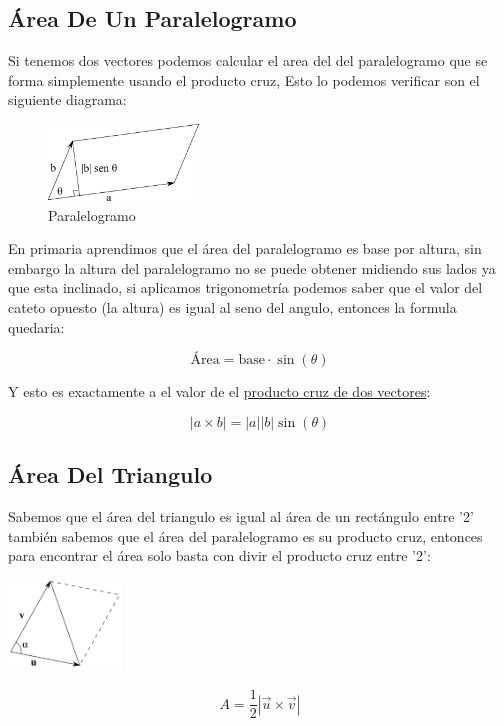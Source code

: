 \documentclass{article}
\begin{document}
\subsection{Área De Un Paralelogramo}
\label{sec:orgae3d727}
Si tenemos dos vectores podemos calcular el area del del paralelogramo que se forma simplemente usando el producto cruz, Esto lo podemos verificar son el siguiente diagrama:

\begin{figure}[htbp]
\centering
\includegraphics[width=4cm]{img/producto-cruz.png}
\caption{Paralelogramo}
\end{figure}

En primaria aprendimos que el área del paralelogramo es base por altura, sin embargo la altura del paralelogramo no se puede obtener midiendo sus lados ya que esta inclinado, si aplicamos trigonometría podemos saber que el valor del cateto opuesto (la altura) es igual al seno del angulo, entonces la formula quedaria:

\[
  {\text{Área} = \text{base} \cdot \sin(\theta)}
\]

Y esto es exactamente a el valor de el \uline{producto cruz de dos vectores}:

\[
  {|a \times b|=|a||b|\sin(\theta)}
\]

\subsection{Área Del Triangulo}
\label{sec:org8d9f218}
Sabemos que el área del triangulo es igual al área de un rectángulo entre '2' también sabemos que el área del paralelogramo es su producto cruz, entonces para encontrar el área solo basta con divir el producto cruz entre '2':

\begin{center}
\includegraphics[width=3cm]{img/area-triangulo.png}
\end{center}

\[
A = \frac{1}{2}|\vec{u}\times\vec{v}|
\]
\end{document}
